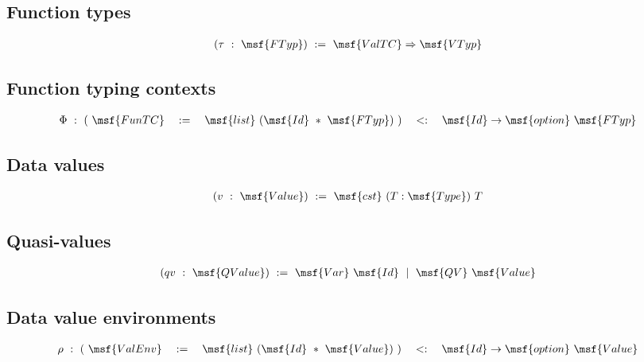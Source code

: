 \documentclass{article}
\begin{document}
\subsection{Function types}


\begin{gather}
(\tau \ : \ \msf{FTyp}) \ := \ \msf{ValTC} \Rightarrow \msf{VTyp}
\end{gather}



\subsection{Function typing contexts}

\begin{gather}
  \begin{array}{lll}
    \Phi \ : \ ( \ \msf{FunTC} \quad := \quad \msf{list} \ (\msf{Id} \ *
\ \msf{FTyp}) \ ) \quad <: \quad  \msf{Id} \to \msf{option} \ \msf{FTyp}
\end{array}
\end{gather}  



\subsection{Data values}

\begin{gather}
  (v \ : \ \msf{Value}) \ := \ \msf{cst} \ (T : \msf{Type}) \ T 
\end{gather}



\subsection{Quasi-values}

\begin{gather}
  (qv \ : \ \msf{QValue}) \ := \ \msf{Var} \ \msf{Id} \ \mid \ 
                               \msf{QV} \ \msf{Value} 
\end{gather}




\subsection{Data value environments}

\begin{gather}
\begin{array}{lll}  
  \rho \ : \ ( \ \msf{ValEnv} \quad := \quad \msf{list} \ (\msf{Id} \ *
  \ \msf{Value}) \ ) \quad <: \quad  \msf{Id} \to \msf{option} \ \msf{Value}
\end{array}
\end{gather}  
\end{document}
